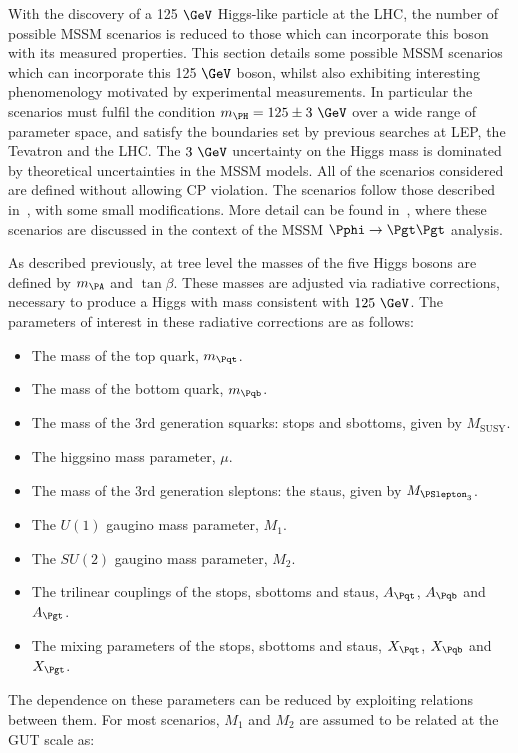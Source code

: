 With the discovery of a 125$~\GeV$ Higgs-like particle at the LHC, the number of
possible \ac{MSSM} scenarios is reduced to those which can incorporate this boson
with its measured properties. This section details some possible \ac{MSSM} scenarios
which can incorporate this 125$~\GeV$ boson, whilst also exhibiting interesting
phenomenology motivated by experimental measurements. In particular the
scenarios must fulfil the condition $m_{\PH} = 125 \pm 3~\GeV$ over a wide range
of parameter space, and satisfy the boundaries set by previous searches at LEP,
the Tevatron and the LHC. The $3~\GeV$ uncertainty on the Higgs mass is
dominated by theoretical uncertainties in the MSSM models. All of the scenarios 
considered are defined without allowing CP violation. The scenarios follow those
described in~\cite{MSSMScenarios}, with some small modifications. More detail
can be found in~\cite{HIG-13-021}, where these scenarios are discussed in the context
of the MSSM $\Pphi \to \Pgt\Pgt$ analysis. 

As described previously, at tree level the masses of the five Higgs bosons are
defined by $m_{\PA}$ and $\tan\beta$. These masses are adjusted via radiative
corrections, necessary to produce a Higgs with mass consistent with $125~\GeV$.
The parameters of interest in these radiative corrections are as follows:

\begin{itemize}
\item The mass of the top quark, $m_{\Pqt}$.
\item The mass of the bottom quark, $m_{\Pqb}$.
\item The mass of the 3rd generation squarks: stops and sbottoms, given by
$M_{\text{SUSY}}$.
\item The higgsino mass parameter, $\mu$.
\item The mass of the 3rd generation sleptons: the staus, given by
$M_{\PSlepton_{3}}$.
\item The $U(1)$ gaugino mass parameter, $M_{1}$.
\item The $SU(2)$ gaugino mass parameter, $M_{2}$.
\item The trilinear couplings of the stops, sbottoms and staus, $A_{\Pqt}$,
$A_{\Pqb}$ and $A_{\Pgt}$.
\item The mixing parameters of the stops, sbottoms and staus, $X_{\Pqt}$,
$X_{\Pqb}$ and $X_{\Pgt}$.
\end{itemize}

The dependence on these parameters can be reduced by exploiting relations
between them. For most scenarios, $M_{1}$ and $M_{2}$ are assumed to be related
at the GUT scale as:

